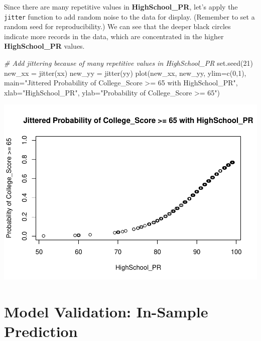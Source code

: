 \documentclass[
]{article}
\newenvironment{Shaded}{\begin{snugshade}}{\end{snugshade}}
\newcommand{\AttributeTok}[1]{\textcolor[rgb]{0.77,0.63,0.00}{#1}}
\newcommand{\CommentTok}[1]{\textcolor[rgb]{0.56,0.35,0.01}{\textit{#1}}}
\newcommand{\DecValTok}[1]{\textcolor[rgb]{0.00,0.00,0.81}{#1}}
\newcommand{\FunctionTok}[1]{\textcolor[rgb]{0.00,0.00,0.00}{#1}}
\newcommand{\NormalTok}[1]{#1}
\newcommand{\OtherTok}[1]{\textcolor[rgb]{0.56,0.35,0.01}{#1}}
\newcommand{\StringTok}[1]{\textcolor[rgb]{0.31,0.60,0.02}{#1}}
\begin{document}
Since there are many repetitive values in \textbf{HighSchool\_PR}, let's
apply the \texttt{jitter} function to add random noise to the data for
display. (Remember to set a random seed for reproducibility.) We can see
that the deeper black circles indicate more records in the data, which
are concentrated in the higher \textbf{HighSchool\_PR} values.

\begin{Shaded}
\begin{Highlighting}[]
\CommentTok{\# Add jittering because of many repetitive values in HighSchool\_PR}
\FunctionTok{set.seed}\NormalTok{(}\DecValTok{21}\NormalTok{)}
\NormalTok{new\_xx }\OtherTok{=} \FunctionTok{jitter}\NormalTok{(xx)}
\NormalTok{new\_yy }\OtherTok{=} \FunctionTok{jitter}\NormalTok{(yy)}
\FunctionTok{plot}\NormalTok{(new\_xx, new\_yy, }\AttributeTok{ylim=}\FunctionTok{c}\NormalTok{(}\DecValTok{0}\NormalTok{,}\DecValTok{1}\NormalTok{),}
     \AttributeTok{main=}\StringTok{"Jittered Probability of College\_Score \textgreater{}= 65 with HighSchool\_PR"}\NormalTok{,}
     \AttributeTok{xlab=}\StringTok{"HighSchool\_PR"}\NormalTok{,}
     \AttributeTok{ylab=}\StringTok{"Probability of College\_Score \textgreater{}= 65"}\NormalTok{)}
\end{Highlighting}
\end{Shaded}

\includegraphics{PTT_Analysis_of_Test_Scores_Unfinished_files/figure-latex/validation-jittering-1.pdf}

\hypertarget{validation}{%
\section{Model Validation: In-Sample Prediction}\label{validation}}
\end{document}
